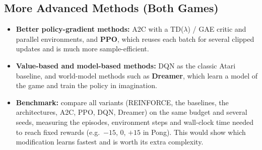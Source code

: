 \subsection{More Advanced Methods (Both Games)}

\begin{itemize}
  \item \textbf{Better policy-gradient methods:} A2C with a TD($\lambda$) / GAE critic and parallel environments, and \textbf{PPO}, which reuses each batch for several clipped updates and is much more sample-efficient.
  \item \textbf{Value-based and model-based methods:} DQN as the classic Atari baseline, and world-model methods such as \textbf{Dreamer}, which learn a model of the game and train the policy in imagination.
  \item \textbf{Benchmark:} compare all variants (REINFORCE, the baselines, the architectures, A2C, PPO, DQN, Dreamer) on the same budget and several seeds, measuring the episodes, environment steps and wall-clock time needed to reach fixed rewards (e.g.\ $-15$, 0, $+15$ in Pong). This would show which modification learns fastest and is worth its extra complexity.
\end{itemize}
